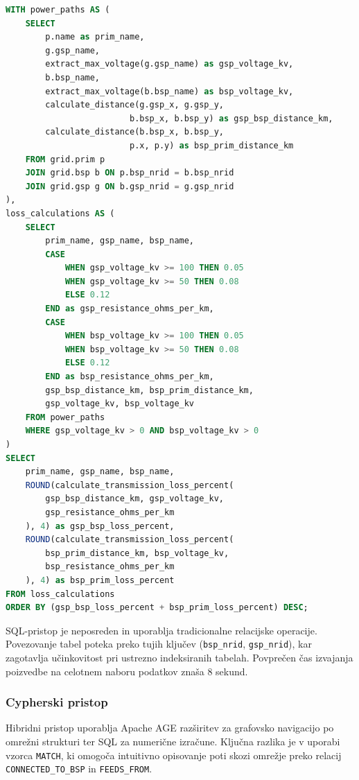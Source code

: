 \documentclass[a4paper,12pt,openright]{book}
\begin{document}
\begin{lstlisting}[language=SQL, caption={SQL pristop - jedro poizvedbe}, captionpos=b, label={lst:power_loss_sql}]
WITH power_paths AS (
    SELECT 
        p.name as prim_name,
        g.gsp_name,
        extract_max_voltage(g.gsp_name) as gsp_voltage_kv,
        b.bsp_name,
        extract_max_voltage(b.bsp_name) as bsp_voltage_kv,
        calculate_distance(g.gsp_x, g.gsp_y, 
                         b.bsp_x, b.bsp_y) as gsp_bsp_distance_km,
        calculate_distance(b.bsp_x, b.bsp_y, 
                         p.x, p.y) as bsp_prim_distance_km
    FROM grid.prim p
    JOIN grid.bsp b ON p.bsp_nrid = b.bsp_nrid
    JOIN grid.gsp g ON b.gsp_nrid = g.gsp_nrid
),
loss_calculations AS (
    SELECT 
        prim_name, gsp_name, bsp_name,
        CASE 
            WHEN gsp_voltage_kv >= 100 THEN 0.05
            WHEN gsp_voltage_kv >= 50 THEN 0.08
            ELSE 0.12
        END as gsp_resistance_ohms_per_km,
        CASE 
            WHEN bsp_voltage_kv >= 100 THEN 0.05
            WHEN bsp_voltage_kv >= 50 THEN 0.08  
            ELSE 0.12
        END as bsp_resistance_ohms_per_km,
        gsp_bsp_distance_km, bsp_prim_distance_km,
        gsp_voltage_kv, bsp_voltage_kv
    FROM power_paths
    WHERE gsp_voltage_kv > 0 AND bsp_voltage_kv > 0
)
SELECT 
    prim_name, gsp_name, bsp_name,
    ROUND(calculate_transmission_loss_percent(
        gsp_bsp_distance_km, gsp_voltage_kv, 
        gsp_resistance_ohms_per_km
    ), 4) as gsp_bsp_loss_percent,
    ROUND(calculate_transmission_loss_percent(
        bsp_prim_distance_km, bsp_voltage_kv, 
        bsp_resistance_ohms_per_km
    ), 4) as bsp_prim_loss_percent
FROM loss_calculations
ORDER BY (gsp_bsp_loss_percent + bsp_prim_loss_percent) DESC;
\end{lstlisting}

SQL-pristop je neposreden in uporablja tradicionalne relacijske operacije. Povezovanje tabel poteka preko tujih ključev (\texttt{bsp\_nrid}, \texttt{gsp\_nrid}), kar zagotavlja učinkovitost pri ustrezno indeksiranih tabelah. Povprečen čas izvajanja poizvedbe na celotnem naboru podatkov znaša 8 sekund.

\subsubsection{Cypherski pristop}

Hibridni pristop uporablja Apache AGE razširitev za grafovsko navigacijo po omrežni strukturi ter SQL za numerične izračune. Ključna razlika je v uporabi vzorca \texttt{MATCH}, ki omogoča intuitivno opisovanje poti skozi omrežje preko relacij \texttt{CONNECTED\_TO\_BSP} in \texttt{FEEDS\_FROM}.
\end{document}
